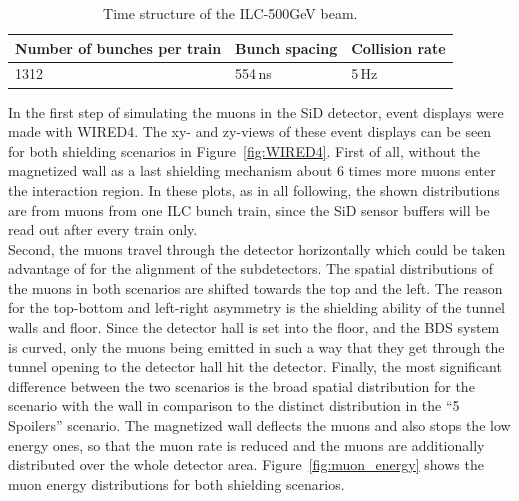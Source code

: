 \begin{table}
\caption{Time structure of the ILC-500GeV beam.}
\label{tab:Beam_TimeStructure}
\begin{tabular}{lll}
\hline\hline
\textbf{Number of bunches per train} & \textbf{Bunch spacing} &  \textbf{Collision rate} \\
\hline
1312 & \unit{554}\,{ns} & \unit{5}\,{Hz}\\
\hline\hline
\end{tabular}
\end{table}

In the first step of simulating the muons in the SiD detector, event displays were made with WIRED4\cite{Wired4}.
The xy- and zy-views of these event displays can be seen for both shielding scenarios in Figure~\ref{fig:WIRED4}.
First of all, without the magnetized wall as a last shielding mechanism about 6 times more muons enter the interaction region.
In these plots, as in all following, the shown distributions are from muons from one ILC bunch train, since the SiD sensor buffers will be read out after every train only.\\
Second, the muons travel through the detector horizontally which could be taken advantage of for the alignment of the subdetectors.
The spatial distributions of the muons in both scenarios are shifted towards the top and the left.
The reason for the top-bottom and left-right asymmetry is the shielding ability of the tunnel walls and floor.
Since the detector hall is set into the floor, and the BDS system is curved, only the muons being emitted in such a way that they get through the tunnel opening to the detector hall hit the detector.
Finally, the most significant difference between the two scenarios is the broad spatial distribution for the scenario with the wall in comparison to the distinct distribution in the ``5 Spoilers'' scenario.
The magnetized wall deflects the muons and also stops the low energy ones, so that the muon rate is reduced and the muons are additionally distributed over the whole detector area.
Figure~\ref{fig:muon_energy} shows the muon energy distributions for both shielding scenarios.

